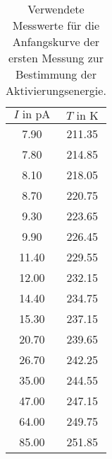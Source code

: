 \FloatBarrier
\begin{table}
  \centering
  \caption{Verwendete Messwerte für die Anfangskurve der ersten Messung zur Bestimmung der Aktivierungsenergie.}
  \label{tab:linfit1}
    \begin{tabular}{c c}
      \toprule
      $I \text{ in } \si{\pico\ampere}$ & $ T \text{ in } \si{\kelvin} $ \\
      \midrule
       7.90 & 211.35\\
       7.80 & 214.85\\
       8.10 & 218.05\\
       8.70 & 220.75\\
       9.30 & 223.65\\
       9.90 & 226.45\\
      11.40 & 229.55\\
      12.00 & 232.15\\
      14.40 & 234.75\\
      15.30 & 237.15\\
      20.70 & 239.65\\
      26.70 & 242.25\\
      35.00 & 244.55\\
      47.00 & 247.15\\
      64.00 & 249.75\\
      85.00 & 251.85\\
      \bottomrule
    \end{tabular}
\end{table}


